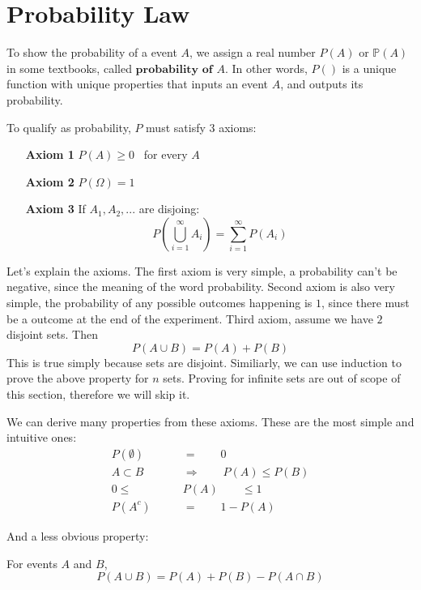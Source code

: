 \section{Probability Law}
To show the probability of a event $A$, we assign a real number $P(A)$ or $\mathbb{P}(A)$ in some textbooks, called $\textbf{probability of $A$}$. In other words, $P()$ is a unique function with unique properties that inputs an event $A$, and outputs its probability.
\par 
To qualify as probability, $P$ must satisfy $3$ axioms:
\begin{itemize}
    \item[\textbf{Axiom 1}] $P(A) \ge 0$ \ for every $A$
    \item[\textbf{Axiom 2}] $P(\Omega)=1$
    \item[\textbf{Axiom 3}] If $A_1,A_2,...$ are disjoing: 
    $$P \left( \bigcup^{\infty}_{i=1} A_i \right)= \sum^{\infty}_{i=1}P(A_i) $$
\end{itemize}

\par
Let's explain the axioms. The first axiom is very simple, a probability can't be negative, since the meaning of the word probability.
Second axiom is also very simple, the probability of any possible outcomes happening is $1$, since there must be a outcome at the end of the experiment.
Third axiom, assume we have $2$ disjoint sets. Then
$$P(A \cup B)= P(A)+P(B)$$
This is true simply because sets are disjoint. Similiarly, we can use induction to prove the above property for $n$ sets. Proving for infinite sets are out of scope of this section, therefore we will skip it.

\par
We can derive many properties from these axioms. These are the most simple and intuitive ones:
$$ \begin{aligned}
    P(\emptyset) \qquad &= \qquad 0 \\
    A \subset B \qquad &\Longrightarrow  \qquad P(A) \le P(B) \\
    0 \le       \qquad &P(A) \qquad \le 1 \\ 
    P(A^c)  \qquad  & = \qquad 1- P(A)
\end{aligned}$$ 

And a less obvious property: 
\begin{lemma} For  events $A$ and $B$,
    $$ P \left(A \cup B\right)= P(A)+P(B)-P(A \cap B)$$
\end{lemma}

